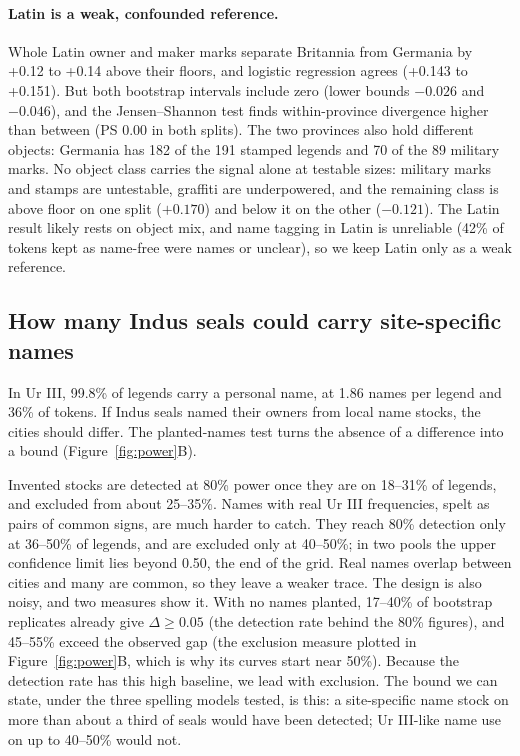 \documentclass[11pt,a4paper]{article}
\begin{document}
\paragraph{Latin is a weak, confounded reference.} Whole Latin owner and maker marks separate Britannia from Germania by +0.12 to +0.14 above their floors, and logistic regression agrees (+0.143 to +0.151). %
But both bootstrap intervals include zero (lower bounds $-0.026$ and $-0.046$), and the Jensen--Shannon test finds within-province divergence higher than between (PS 0.00 in both splits). %
The two provinces also hold different objects: Germania has 182 of the 191 stamped legends and 70 of the 89 military marks. %
No object class carries the signal alone at testable sizes: military marks and stamps are untestable, graffiti are underpowered, and the remaining class is above floor on one split ($+0.170$) and below it on the other ($-0.121$). %
The Latin result likely rests on object mix, and name tagging in Latin is unreliable (42\% of tokens kept as name-free were names or unclear), so we keep Latin only as a weak reference. %

\subsection{How many Indus seals could carry site-specific names}
\label{sec:bound}

In Ur III, 99.8\% of legends carry a personal name, at 1.86 names per legend and 36\% of tokens. %
If Indus seals named their owners from local name stocks, the cities should differ.
The planted-names test turns the absence of a difference into a bound (Figure~\ref{fig:power}B).

Invented stocks are detected at 80\% power once they are on 18--31\% of legends, and excluded from about 25--35\%. %
Names with real Ur III frequencies, spelt as pairs of common signs, are much harder to catch.
They reach 80\% detection only at 36--50\% of legends, and are excluded only at 40--50\%; in two pools the upper confidence limit lies beyond 0.50, the end of the grid. %
Real names overlap between cities and many are common, so they leave a weaker trace.
The design is also noisy, and two measures show it.
With no names planted, 17--40\% of bootstrap replicates already give $\Delta \geq 0.05$ (the detection rate behind the 80\% figures), and 45--55\% exceed the observed gap (the exclusion measure plotted in Figure~\ref{fig:power}B, which is why its curves start near 50\%). %
Because the detection rate has this high baseline, we lead with exclusion.
The bound we can state, under the three spelling models tested, is this: a site-specific name stock on more than about a third of seals would have been detected; Ur III-like name use on up to 40--50\% would not.
\end{document}
